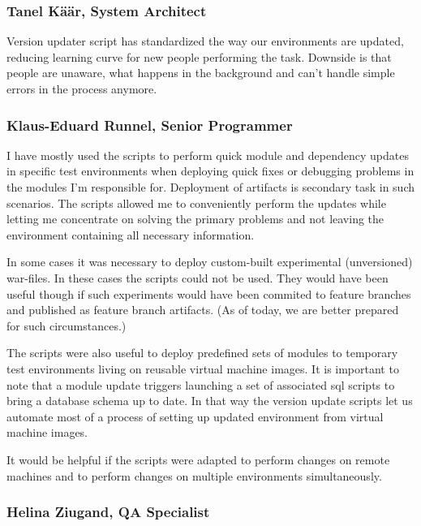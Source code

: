 \documentclass[12pt]{report}
\begin{document}
  \subsubsection{Tanel Käär, System Architect}
  
  \begin{displayquote}
  Version updater script has standardized the way our environments are updated, reducing learning curve for new people performing the task. Downside is that people are unaware, what happens in the background and can't handle simple errors in the process anymore.
  \end{displayquote}
  
  \subsubsection{Klaus-Eduard Runnel, Senior Programmer}
  
  \begin{displayquote}
  I have mostly used the scripts to perform quick module and dependency updates in specific test environments when deploying quick fixes or debugging problems in the modules I'm responsible for. Deployment of artifacts is secondary task in such scenarios. The scripts allowed me to conveniently perform the updates while letting me concentrate on solving the primary problems and not leaving the environment containing all necessary information.

In some cases it was necessary to deploy custom-built experimental (unversioned) war-files. In these cases the scripts could not be used.
They would have been useful though if such experiments would have been commited to feature branches and published as feature branch artifacts. (As of today, we are better prepared for such circumstances.)

The scripts were also useful to deploy predefined sets of modules to temporary test environments living on reusable virtual machine images. It is important to note that a module update triggers launching a set of associated sql scripts to bring a database schema up to date. In that way the version update scripts let us automate most of a process of setting up updated environment from virtual machine images.

It would be helpful if the scripts were adapted to perform changes on remote machines and to perform changes on multiple environments simultaneously.
  \end{displayquote}

  \subsubsection{Helina Ziugand, QA Specialist}
  
\end{document}
